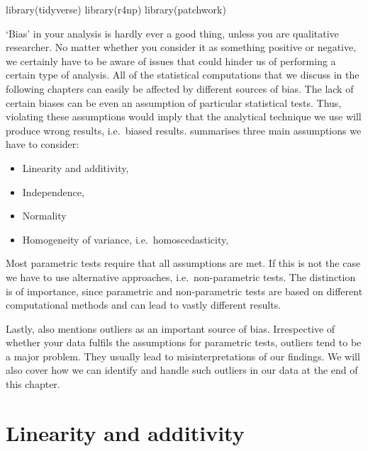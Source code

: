 \documentclass[
]{book}
\newenvironment{Shaded}{\begin{snugshade}}{\end{snugshade}}
\newcommand{\FunctionTok}[1]{\textcolor[rgb]{0.00,0.00,0.00}{#1}}
\newcommand{\NormalTok}[1]{#1}
\begin{document}
\begin{Shaded}
\begin{Highlighting}[]
\FunctionTok{library}\NormalTok{(tidyverse)}
\FunctionTok{library}\NormalTok{(r4np)}
\FunctionTok{library}\NormalTok{(patchwork)}
\end{Highlighting}
\end{Shaded}

`Bias' in your analysis is hardly ever a good thing, unless you are qualitative researcher. No matter whether you consider it as something positive or negative, we certainly have to be aware of issues that could hinder us of performing a certain type of analysis. All of the statistical computations that we discuss in the following chapters can easily be affected by different sources of bias. The lack of certain biases can be even an assumption of particular statistical tests. Thus, violating these assumptions would imply that the analytical technique we use will produce wrong results, i.e.~biased results. \citet{field2013discovering} summarises three main assumptions we have to consider:

\begin{itemize}
\item
  Linearity and additivity,
\item
  Independence,
\item
  Normality
\item
  Homogeneity of variance, i.e.~homoscedasticity,
\end{itemize}

Most parametric tests require that all assumptions are met. If this is not the case we have to use alternative approaches, i.e.~non-parametric tests. The distinction is of importance, since parametric and non-parametric tests are based on different computational methods and can lead to vastly different results.

Lastly, \citet{field2013discovering} also mentions outliers as an important source of bias. Irrespective of whether your data fulfils the assumptions for parametric tests, outliers tend to be a major problem. They usually lead to misinterpretations of our findings. We will also cover how we can identify and handle such outliers in our data at the end of this chapter.

\hypertarget{additivity-and-linearity}{%
\section{Linearity and additivity}\label{additivity-and-linearity}}
\end{document}
